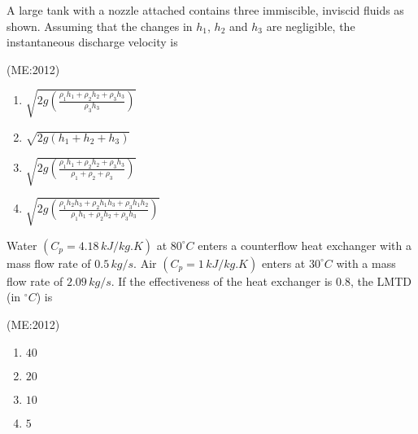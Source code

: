  \iffalse
\title{ME:2012}
\author{AI24BTECH11007}
\section{me}
\chapter{2012}
\fi
 

\item A large tank with a nozzle attached contains three immiscible, inviscid fluids as shown. Assuming that the changes in $h_1$, $h_2$ and $h_3$ are negligible, the instantaneous discharge velocity is
	    \vspace{1cm}
    \begin{center}
	    
    \end{center}
	    \hfill{(ME:2012)}
		\begin{multicols}{2}
    \begin{enumerate}
        \item $ \sqrt{2g \left( \frac{\rho_1 h_1 + \rho_2 h_2 + \rho_3 h_3}{\rho_3 h_3} \right)} $
        \item $\sqrt{2g(h_1 + h_2 + h_3)}$
	\item $\sqrt{2g (\frac{\rho_1 h_1 + \rho_2 h_2 + \rho_3 h_3}{\rho_1 + \rho_2 + \rho_3})}$
	\item $\sqrt{2g (\frac{\rho_1 h_2 h_3 + \rho_2 h_1 h_3 + \rho_3 h_1 h_2}{\rho_1 h_1 + \rho_2 h_2 + \rho_3 h_3})}$
    \end{enumerate}
		\end{multicols}

    \item Water $(C_p = 4.18 \, kJ/kg.K)$ at $80^\circ C$ enters a counterflow heat exchanger with a mass flow rate of $0.5 \, kg/s$. Air $(C_p = 1 \, kJ/kg.K)$ enters at $30^\circ C$ with a mass flow rate of $2.09 \, kg/s$. If the effectiveness of the heat exchanger is 0.8, the LMTD (in $^\circ C$) is

	     \hfill{(ME:2012)}
		\begin{multicols}{4}
    \begin{enumerate}
        \item $40$
        \item $20$
        \item $10$
        \item $5$
    \end{enumerate}
\end{multicols}

